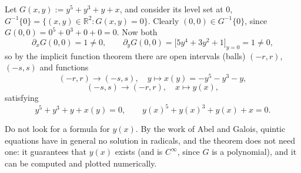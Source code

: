 \begin{center}
\end{center}

\begin{example}
Let $G(x,y) := y^5+y^3+y+x$, and consider its level set at $0$,
$G^{-1}\{0\} = \{(x,y)\in\mathbb{R}^2 : G(x,y)=0\}$. Clearly $(0,0)\in G^{-1}\{0\}$, since
$G(0,0)=0^5+0^3+0+0=0$. Now both
\[\partial_xG(0,0)=1\neq0, \qquad \partial_yG(0,0)=\big[5y^4+3y^2+1\big]_{y=0}=1\neq0,\]
so by the implicit function theorem there are open intervals (balls) $(-r,r)$, $(-s,s)$ and
functions
\[(-r,r)\to(-s,s), \quad y\mapsto x(y) = -y^5-y^3-y,\]
\[(-s,s)\to(-r,r), \quad x\mapsto y(x),\]
satisfying
\[y^5+y^3+y+x(y)=0, \qquad y(x)^5+y(x)^3+y(x)+x=0.\]

\begin{remark}
Do not look for a formula for $y(x)$. By the work of Abel and Galois, quintic equations have in
general no solution in radicals, and the theorem does not need one: it guarantees that $y(x)$
exists (and is $C^\infty$, since $G$ is a polynomial), and it can be computed and plotted
numerically.
\end{remark}
\end{example}

